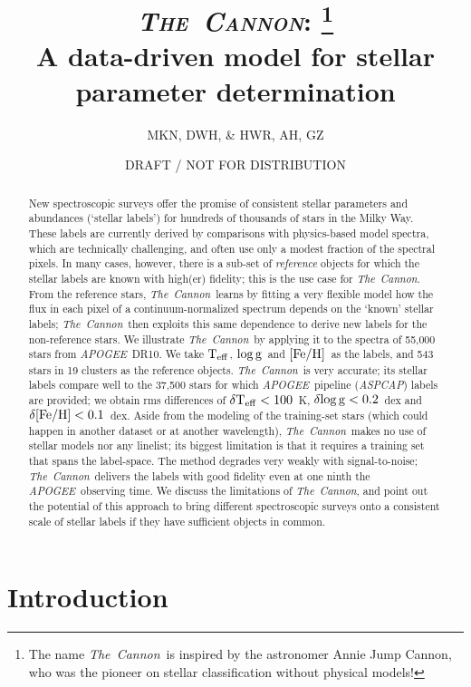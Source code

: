 \documentclass[12pt, preprint]{aastex}
\newcommand{\teff}{\mbox{$\rm T_{eff}$}}
\newcommand{\feh}{\mbox{$\rm [Fe/H]$}}
\newcommand{\logg}{\mbox{$\rm \log g$}}
\newcommand{\tc}{\textsl{The~Cannon}}
\newcommand{\apogee}{\textsl{APOGEE}}
\newcommand{\aspcap}{\textsl{ASPCAP}}
\begin{document}
\title{\textsc{\tc: \footnote{The name \tc\ is inspired by the astronomer Annie Jump Cannon,
who was the pioneer on stellar classification without physical models!}}\\ A data-driven model for stellar parameter determination}
\author{
  MKN,
  DWH,
  \&
  HWR,
  AH, GZ} 
\date{DRAFT / NOT FOR DISTRIBUTION}



\begin{abstract}%
New spectroscopic surveys offer the promise of consistent stellar
parameters and abundances (`stellar labels') for hundreds of thousands
of stars in the Milky Way. 
These labels are currently derived by comparisons with physics-based
model spectra, which are technically challenging, and often use only a
modest fraction of the spectral pixels. 
In many cases, however, there is a sub-set of \emph{reference}
objects for which the stellar labels are known with high(er)
fidelity; this is the use case for \tc.
From the reference stars, \tc\ learns by fitting a very flexible
model how the flux in each pixel of a continuum-normalized spectrum
depends on the `known' stellar labels; \tc\ then exploits this same
dependence to derive new labels for the non-reference stars.
We illustrate \tc\ by applying it to the spectra of 55,000 stars from
\apogee\ DR10. 
We take \teff, \logg\ and \feh\ as the labels, and 543 stars in 19
clusters as the reference objects. 
\tc\ is very accurate; its stellar labels compare well to the 37,500
stars for which \apogee\ pipeline (\aspcap) labels are provided; we
obtain rms differences of $\delta\teff< 100$~K, $\delta\logg< 0.2$~dex
and $\delta\feh< 0.1$~dex.
Aside from the modeling of the training-set stars (which could happen
in another dataset or at another wavelength), \tc\ makes no use of
stellar models nor any linelist; its biggest limitation is that it
requires a training set that spans the label-space. 
The method degrades very weakly with signal-to-noise; \tc\ delivers
the labels with good fidelity even at one ninth the
\apogee\ observing time. 
We discuss the limitations of \tc, and point out the potential of this
approach to bring different spectroscopic surveys onto a consistent
scale of stellar labels if they have sufficient objects in common.
\end{abstract}


\section{Introduction}\label{sec:Intro}
\end{document}
